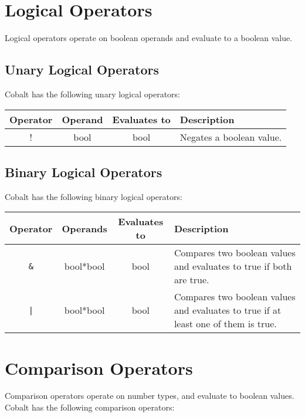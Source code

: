 \documentclass[a4paper,appendixprefix]{scrreprt}
\begin{document}
\section{Logical Operators}
Logical operators operate on boolean operands and evaluate to a boolean value.

\subsection{Unary Logical Operators}
Cobalt has the following unary logical operators:

\begin{center}
  \begin{tabularx}{\textwidth}{|c|c|c|X|}
    \hline
    \textbf{Operator} & \textbf{Operand} & \textbf{Evaluates to} & \textbf{Description} \\ \hline
    ! & bool & bool & Negates a boolean value. \\ \hline
  \end{tabularx}
\end{center}


\subsection{Binary Logical Operators}
Cobalt has the following binary logical operators:

\begin{center}
  \begin{tabularx}{\textwidth}{|c|c|c|X|}
    \hline
    \textbf{Operator} & \textbf{Operands} & \textbf{Evaluates to} & \textbf{Description} \\ \hline
    \verb|&| & bool*bool & bool & Compares two boolean values and evaluates to true if both are true. \\ \hline
    \texttt{|} & bool*bool & bool & Compares two boolean values and evaluates to true if at least one of them is true. \\ \hline
  \end{tabularx}
\end{center}

\pagebreak

\section{Comparison Operators}
Comparison operators operate on number types, and evaluate to boolean values. Cobalt has the following comparison operators:
\end{document}
